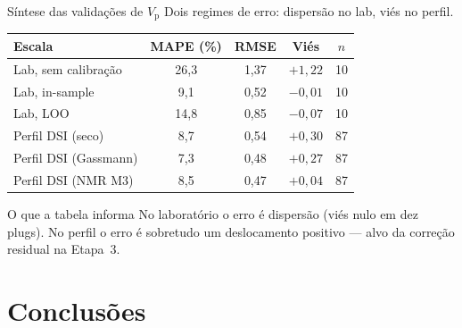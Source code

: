 \documentclass[aspectratio=169,10pt]{beamer}
\newcommand{\Vp}{\ensuremath{V_{\mathrm{p}}}}
\begin{document}
\begin{frame}{Síntese das validações de \Vp{}}
  \footnotesize
  Dois regimes de erro: dispersão no lab, viés no perfil.
  \vspace{0.08cm}
  \centering
  \scriptsize
  \begin{tabular}{lcccc}
    \toprule
    Escala & MAPE (\%) & RMSE & Viés & $n$ \\
    \midrule
    Lab, sem calibração & 26,3 & 1,37 & $+1{,}22$ & 10 \\
    Lab, in-sample & 9,1 & 0,52 & $-0{,}01$ & 10 \\
    Lab, LOO & 14,8 & 0,85 & $-0{,}07$ & 10 \\
    Perfil DSI (seco) & 8,7 & 0,54 & $+0{,}30$ & 87 \\
    Perfil DSI (Gassmann) & 7,3 & 0,48 & $+0{,}27$ & 87 \\
    Perfil DSI (NMR M3) & 8,5 & 0,47 & $+0{,}04$ & 87 \\
    \bottomrule
  \end{tabular}
  \vspace{0.12cm}
  \begin{block}{O que a tabela informa}
    \scriptsize
    No laboratório o erro é dispersão (viés nulo em dez plugs).
    No perfil o erro é sobretudo um deslocamento positivo --- alvo da
    correção residual na Etapa~3.
  \end{block}
\end{frame}

\section{Conclusões}
\end{document}
